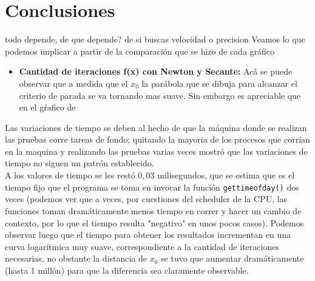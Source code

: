 \section{Conclusiones}
todo depende, de que depende? de si buscas velocidad o precision
Veamos lo que podemos implicar a partir de la comparación que se hizo de cada gráfico
\begin{itemize}
\item {\bf Cantidad de iteraciones f(x) con Newton y Secante:} Acá se puede observar que a medida que el $x_0$ la parábola que se dibuja para alcanzar el criterio de parada se va tornando mas suave. Sin embargo es apreciable que en el gŕafico de 

\end{itemize}



Las variaciones de tiempo se deben al hecho de que la máquina donde se realizan las pruebas corre tareas de fondo; quitando la mayoria de los procesos que corrían en la maquina y realizando las pruebas varias veces mostró que las variaciones de tiempo no siguen un patrón establecido.\\

A los valores de tiempo se les restó $0,03$ milisegundos, que se estima que es el tiempo fijo que el programa se toma en invocar la función \verb|gettimeofday()| dos veces (podemos ver que a veces, por cuestiones del scheduler de la CPU, las funciones toman dramáticamente menos tiempo en correr y hacer un cambio de contexto, por lo que el tiempo resulta "negativo" en unos pocos casos). Podemos observar luego que el tiempo para obtener los resultados incrementan en una curva logarítmica muy suave, correspondiente a la cantidad de iteraciones necesarias, no obstante la distancia de $x_0$ se tuvo que aumentar dramáticamente (hasta 1 millón) para que la diferencia sea claramente observable.